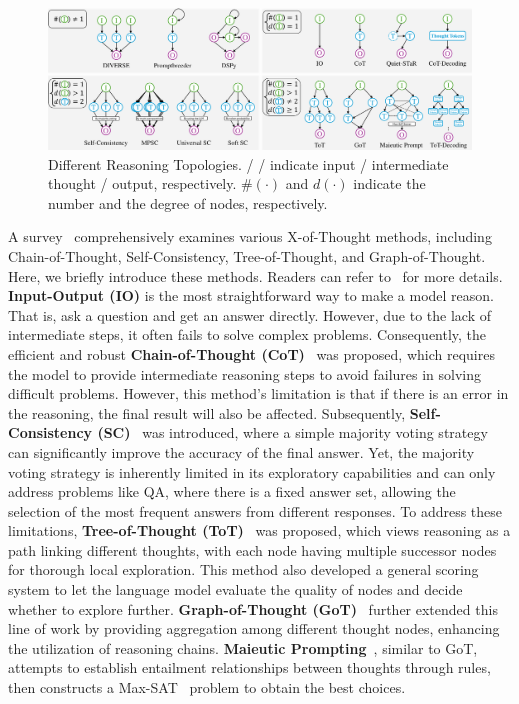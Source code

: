\documentclass[lettersize,journal]{IEEEtran}
\newcommand{\circledColoredChar}[2]{%
  \textcolor{#1}{
    \raisebox{.5pt}{\textcircled{\raisebox{-0.8pt}{\scalebox{0.85}{#2}}}}
  }%
}  %
\begin{document}
\begin{figure}[t!]
    \centering
    \includegraphics[width=\linewidth]{figures/reason_topo.pdf}
    \caption{Different Reasoning Topologies. \circledColoredChar{darkgreen}{I}/ \circledColoredChar{darkblue}{T}/ \circledColoredChar{darkpurple}{O} indicate input / intermediate thought / output, respectively. $\#(\cdot)$ and $d(\cdot)$ indicate the number and the degree of nodes, respectively.}
    \label{fig:reason_topo}
\end{figure}

A survey~\cite{SurveyXofThought_24_arXiv_ETH} comprehensively examines various X-of-Thought methods, including Chain-of-Thought, Self-Consistency, Tree-of-Thought, and Graph-of-Thought. Here, we briefly introduce these methods. Readers can refer to~\cite{SurveyXofThought_24_arXiv_ETH} for more details. \textbf{Input-Output (IO)} is the most straightforward way to make a model reason. That is, ask a question and get an answer directly. However, due to the lack of intermediate steps, it often fails to solve complex problems. Consequently, the efficient and robust \textbf{Chain-of-Thought (CoT)}~\cite{RealCoT_22_NeuIPS_Google} was proposed, which requires the model to provide intermediate reasoning steps to avoid failures in solving difficult problems. However, this method's limitation is that if there is an error in the reasoning, the final result will also be affected. Subsequently, \textbf{Self-Consistency (SC)}~\cite{SelfConsistency_23_ICLR_Google} was introduced, where a simple majority voting strategy can significantly improve the accuracy of the final answer. Yet, the majority voting strategy is inherently limited in its exploratory capabilities and can only address problems like QA, where there is a fixed answer set, allowing the selection of the most frequent answers from different responses. To address these limitations, \textbf{Tree-of-Thought (ToT)}~\cite{ToT_23_NeuIPS_Princeton} was proposed, which views reasoning as a path linking different thoughts, with each node having multiple successor nodes for thorough local exploration. This method also developed a general scoring system to let the language model evaluate the quality of nodes and decide whether to explore further. \textbf{Graph-of-Thought (GoT)}~\cite{GoT_24_AAAI_ETH} further extended this line of work by providing aggregation among different thought nodes, enhancing the utilization of reasoning chains. \textbf{Maieutic Prompting}~\cite{Maieutic_22_EMNLP_UoWashington}, similar to GoT, attempts to establish entailment relationships between thoughts through rules, then constructs a Max-SAT~\cite{Battiti2009} problem to obtain the best choices.
\end{document}
